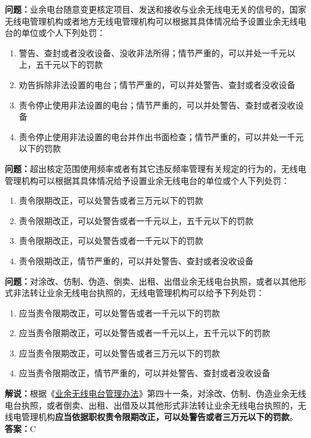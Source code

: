 \textbf{问题：}业余电台随意变更核定项目、发送和接收与业余无线电无关的信号的，国家无线电管理机构或者地方无线电管理机构可以根据其具体情况给予设置业余无线电台的单位或个人下列处罚：
\begin{enumerate}[label=\Alph*), leftmargin=1cm]
	\item  警告、查封或者没收设备、没收非法所得；情节严重的，可以并处一千元以上，五千元以下的罚款
	\item  劝告拆除非法设置的电台；情节严重的，可以并处警告、查封或者没收设备
	\item  责令停止使用非法设置的电台；情节严重的，可以并处警告、查封或者没收设备
	\item  责令停止使用非法设置的电台并作出书面检查；情节严重的，可以并处一千元以下的罚款
\end{enumerate}

\textbf{问题：}超出核定范围使用频率或者有其它违反频率管理有关规定的行为的，无线电管理机构可以根据其具体情况给予设置业余无线电台的单位或个人下列处罚：
\begin{enumerate}[label=\Alph*), leftmargin=1cm]
  \item 责令限期改正，可以处警告或者三万元以下的罚款
  \item 责令限期改正，可以处警告或者一千元以上，五千元以下的罚款
  \item 责令限期改正，可以处警告或者一千元以下的罚款
  \item 责令限期改正，情节严重的，可以并处警告、查封或者没收设备
\end{enumerate}


\textbf{问题：}对涂改、仿制、伪造、倒卖、出租、出借业余无线电台执照，或者以其他形式非法转让业余无线电台执照的，无线电管理机构可以给予下列处罚：
\begin{enumerate}[label=\Alph*), leftmargin=1cm] 
  \item 应当责令限期改正，可以处警告或者一千元以下的罚款
  \item 应当责令限期改正，可以处警告或者一千元以上，五千元以下的罚款
  \item 应当责令限期改正，可以处警告或者三万元以下的罚款
  \item 应当责令限期改正，情节严重的，可以并处警告、查封或者没收设备
\end{enumerate}
\textbf{解说：}根据《\href{https://www.miit.gov.cn/jgsj/zfs/bmgz/art/2020/art_147b69815b3641caad9047735f94c860.html}{业余无线电台管理办法}》第四十一条，对涂改、仿制、伪造业余无线电台执照，或者倒卖、出租、出借及以其他形式非法转让业余无线电台执照的，无线电管理机构\textbf{应当依据职权责令限期改正，可以处警告或者三万元以下的罚款}。\\
\textbf{答案：}C


